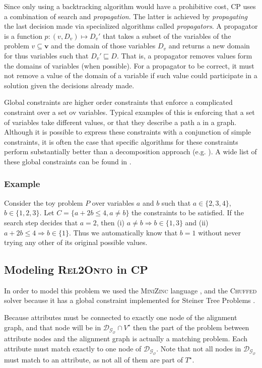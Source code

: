 \documentclass[letterpaper]{article} %
\newcommand{\minizinc}{\textsc{MiniZinc}}
\newcommand{\chuffed}{\textsc{Chuffed}}
\newcommand{\relonto}{\textsc{Rel2Onto}}
\begin{document}
Since only using a backtracking algorithm would have a prohibitive cost, CP 
uses a combination of search and \emph{propagation}. The latter is achieved by 
\emph{propagating} the last decision made via specialized algorithms called 
\emph{propagators}. A propagator is a function $p : (v, D_v) \mapsto D_v'$ that 
takes a subset of the variables of the problem $v \subseteq \boldsymbol{v}$ and 
the domain of those variables $D_v$ and returns a new domain for thus variables 
such that $D_v' \sqsubseteq D$. That is, a propagator removes values form the 
domains of variables (when possible). For a propagator to be correct, it must 
not remove a value of the domain of a variable if such value could participate 
in a solution given the decisions already made.

Global constraints are higher order constraints that enforce a complicated 
constraint over a set ov variables. Typical examples of this is enforcing that 
a set of variables take different values, or that they describe a path a in a 
graph. Although it is possible to express these constraints with a conjunction 
of simple constraints, it is often the case that specific algorithms for these 
constraints perform substantially better than a decomposition approach (e.g. 
\cite{regin1994filtering}). A wide 
list of these global constraints can be found in \cite{beldiceanu2012global}.

\subsubsection{Example} Consider the toy problem $P$ over variables $a$ and $b$ 
such that $a \in \{2,3,4\}$, $b \in \{1,2,3\}$. Let $C = \{a + 2b \leq 4, a 
\neq b\}$ the constraints to be satisfied. If the search step decides that $a = 
2$, then (i) $a \neq b \Rightarrow b \in \{1,3\}$ and (ii) $a + 2b \leq 4  
\Rightarrow b \in \{1\}$. Thus we automatically know that $b = 1$ without never 
trying any other of its original possible values.


\subsection{Modeling \relonto{} in CP}
In order to model this problem we used the \minizinc{} language 
\cite{minizinc}, and the 
\chuffed{} solver \cite{chu2011improving} because it has a global constraint 
implemented for Steiner 
Tree Problems \cite{deuna2016steiner}. 

Because attributes must be connected to exactly one node of the alignment 
graph, and that node will be in $\mathcal{D_{G_O}} \cap V^\star$ 
then the part of the problem between attribute nodes and the alignment graph is 
actually a matching problem. Each attribute must match exactly to one node of 
$\mathcal{D_{G_O}}$. Note that not all nodes in $\mathcal{D_{G_O}}$ must match 
to an attribute, as not all of them are part of $T^\star$.
\end{document}

